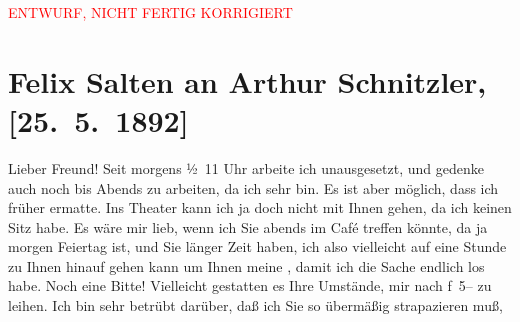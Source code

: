 
\begin{center}
            \textcolor{red}{ENTWURF, NICHT FERTIG KORRIGIERT}
                      \end{center}
            
         
         \renewcommand{\erwaehntePersonen}{Personen: Leopold Weiss}
         \renewcommand{\erwaehnteOrte}{Orte: Wien}
         \renewcommand{\erwaehnteWerke}{Werke: Anatol, Muza}
               \section[Felix Salten an Arthur Schnitzler, {[}25. 5. 1892{]}]{ Felix Salten an Arthur Schnitzler, {[}25. 5. 1892{]}}\nopagebreak{}\rehead{ }\begin{ledgroupsized}[t]{13cm}\normalsize\beginnumbering \toendnotes[C]{\smallbreak\pagebreak[2]} 
\toendnotes[C]{\smallbreak}\pstart
           \noindent{}{\pb}Lieber Freund! Seit morgens ½ 11 Uhr arbeite ich unausgesetzt, und
               gedenke auch noch bis Abends zu arbeiten, da ich sehr \label{K_L03109-1v}\label{K_L03109-1h} bin. Es ist aber
               möglich, dass ich früher ermatte. \pend
           \pstart
           Ins Theater kann ich ja doch nicht mit Ihnen gehen, da ich keinen Sitz habe. Es wäre
               mir lieb, wenn ich Sie abends im Café {\pb}treffen könnte, da \strikeout{\textcolor{gray}{au}} ja morgen Feiertag ist, und Sie
               länger Zeit haben, ich also vielleicht auf eine Stunde zu Ihnen hinauf gehen kann um
               Ihnen meine \label{K_L03109-2v}\label{K_L03109-2h},
               damit ich die Sache endlich los habe. \pend
           \pstart
           Noch eine Bitte! Vielleicht gestatten es Ihre Umstände, mir nach f 5– zu leihen.
               Ich bin sehr {\pb}betrübt darüber, daß ich Sie so übermäßig strapazieren muß,

\end{ledgroupsized}
